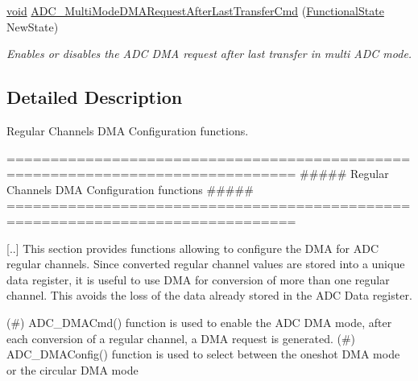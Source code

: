 \begin{DoxyCompactItemize}
\hyperlink{group___n_a_m_e_ga18028b8badbf1ea7e704ccac3c488e82}{void} \hyperlink{group___a_d_c___group5_ga40f2be2edf2a33fc15f4a5933b562970}{A\-D\-C\-\_\-\-Multi\-Mode\-D\-M\-A\-Request\-After\-Last\-Transfer\-Cmd} (\hyperlink{group___exported__types_gac9a7e9a35d2513ec15c3b537aaa4fba1}{Functional\-State} New\-State)
\begin{DoxyCompactList}\small\item\em Enables or disables the A\-D\-C D\-M\-A request after last transfer in multi A\-D\-C mode. \end{DoxyCompactList}\end{DoxyCompactItemize}


\subsection{Detailed Description}
Regular Channels D\-M\-A Configuration functions. \begin{DoxyVerb} ===============================================================================
                   ##### Regular Channels DMA Configuration functions #####
 ===============================================================================  

  [..] This section provides functions allowing to configure the DMA for ADC regular 
  channels. Since converted regular channel values are stored into a unique data register, 
  it is useful to use DMA for conversion of more than one regular channel. This 
  avoids the loss of the data already stored in the ADC Data register. 
  
  (#) ADC_DMACmd() function is used to enable the ADC DMA mode, after each
      conversion of a regular channel, a DMA request is generated.
  (#) ADC_DMAConfig() function is used to select between the oneshot DMA mode 
      or the circular DMA mode\end{DoxyVerb}


